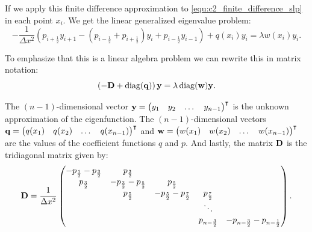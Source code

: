 If we apply this finite difference approximation to \eqref{equ:c2_finite_difference_slp} in each point $x_i$. We get the linear generalized eigenvalue problem:
$$
    -\frac{1}{\Delta x^2}\left(p_{i+\frac{1}{2}} y_{i+1} - \left(p_{i-\frac{1}{2}} + p_{i+\frac{1}{2}}\right) y_i + p_{i-\frac{1}{2}} y_{i-1}\right) + q(x_i) y_i = \lambda w(x_i) y_i \text{.}
$$

To emphasize that this is a linear algebra problem we can rewrite this in matrix notation:
\begin{equation}\label{equ:c2_finite_difference_matrix_problem}
    \left(-\vb{D} + \operatorname{diag}(\vb{q})\right)\vb{y} = \lambda \operatorname{diag}(\vb{w}) \vb{y}\text{.}
\end{equation}

The $(n-1)$-dimensional vector $\vb{y} = {\begin{pmatrix}y_1 & y_2 & \dots & y_{n-1}\end{pmatrix}}^\intercal$ is the unknown approximation of the eigenfunction. The $(n-1)$-dimensional vectors $\vb{q} = {\begin{pmatrix}q(x_1) & q(x_2) & \dots & q(x_{n-1})\end{pmatrix}}^\intercal$  and $\vb{w} = {\begin{pmatrix}w(x_1) & w(x_2) & \dots & w(x_{n-1})\end{pmatrix}}^\intercal$ are the values of the coefficient functions $q$ and $p$. And lastly, the matrix $\vb{D}$ is the tridiagonal matrix given by:
$$
    \vb{D} = \frac{1}{\Delta x^2}\begin{pmatrix}
        -p_{\frac{1}{2}} -p_{\frac{3}{2}} & p_{\frac{3}{2}}                   &                                   &                     &                                            \\
        p_{\frac{3}{2}}                   & -p_{\frac{3}{2}} -p_{\frac{5}{2}} & p_{\frac{5}{2}}                   &                     &                                            \\
                                          & p_{\frac{5}{2}}                   & -p_{\frac{5}{2}} -p_{\frac{7}{2}} & p_{\frac{7}{2}}     &                                            \\
                                          &                                   &                                   & \ddots              &                                            \\
                                          &                                   &                                   & p_{n - \frac{3}{2}} & -p_{n - \frac{3}{2}} - p_{n - \frac{1}{2}} \\
    \end{pmatrix}{}\text{.}
$$

